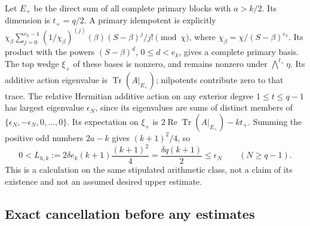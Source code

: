 Let $E_+$ be the direct sum of all complete primary blocks with $a>k/2$.
Its dimension is $t_+=q/2$. A primary idempotent is explicitly
$\chi_\beta\sum_{j=0}^{e_k-1}(1/\chi_\beta)^{(j)}(\beta)
(S-\beta)^j/j!\pmod\chi$, where $\chi_\beta=\chi/(S-\beta)^{e_k}$.
Its product with the powers $(S-\beta)^d$, $0\le d<e_k$, gives a
complete primary basis. The top wedge $\xi_+$ of these bases is nonzero,
and remains nonzero under $\bigwedge^{t_+}\eta$. Its additive action
eigenvalue is $\operatorname{Tr}(A|_{E_+})$; nilpotents contribute zero
to that trace. The relative Hermitian additive action on any exterior
degree $1\le t\le q-1$ has largest eigenvalue $\epsilon_N$, since its
eigenvalues are sums of distinct members of
$\{\epsilon_N,-\epsilon_N,0,\ldots,0\}$. Its expectation on $\xi_+$
is $2\operatorname{Re}\operatorname{Tr}(A|_{E_+})-kt_+$. Summing the
positive odd numbers $2a-k$ gives $(k+1)^2/4$, so
\[
 0<L_{h,k}:=2\delta e_k(k+1)\frac{(k+1)^2}{4}
          =\frac{\delta q(k+1)}2\le\epsilon_N
          \qquad(N\ge q-1).\tag{CAI11}
\]
This is a calculation on the same stipulated arithmetic class, not a
claim of its existence and not an assumed desired upper estimate.

\subsection{Exact cancellation before any estimates}

